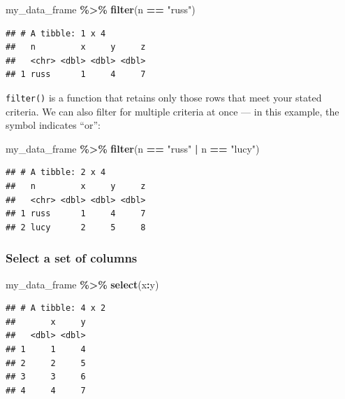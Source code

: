 \documentclass[
  12pt,
]{book}
\newenvironment{Shaded}{\begin{snugshade}}{\end{snugshade}}
\newcommand{\FunctionTok}[1]{\textcolor[rgb]{0.13,0.29,0.53}{\textbf{#1}}}
\newcommand{\NormalTok}[1]{#1}
\newcommand{\SpecialCharTok}[1]{\textcolor[rgb]{0.81,0.36,0.00}{\textbf{#1}}}
\newcommand{\StringTok}[1]{\textcolor[rgb]{0.31,0.60,0.02}{#1}}
\begin{document}
\begin{Shaded}
\begin{Highlighting}[]
\NormalTok{my\_data\_frame }\SpecialCharTok{\%\textgreater{}\%} 
  \FunctionTok{filter}\NormalTok{(n }\SpecialCharTok{==} \StringTok{"russ"}\NormalTok{)}
\end{Highlighting}
\end{Shaded}

\begin{verbatim}
## # A tibble: 1 x 4
##   n         x     y     z
##   <chr> <dbl> <dbl> <dbl>
## 1 russ      1     4     7
\end{verbatim}

\texttt{filter()} is a function that retains only those rows that meet your stated criteria. We can also filter for multiple criteria at once --- in this example, the \texttt{\textbar{}} symbol indicates ``or'':

\begin{Shaded}
\begin{Highlighting}[]
\NormalTok{my\_data\_frame }\SpecialCharTok{\%\textgreater{}\%} 
  \FunctionTok{filter}\NormalTok{(n }\SpecialCharTok{==} \StringTok{"russ"} \SpecialCharTok{|}\NormalTok{ n }\SpecialCharTok{==} \StringTok{"lucy"}\NormalTok{)}
\end{Highlighting}
\end{Shaded}

\begin{verbatim}
## # A tibble: 2 x 4
##   n         x     y     z
##   <chr> <dbl> <dbl> <dbl>
## 1 russ      1     4     7
## 2 lucy      2     5     8
\end{verbatim}

\hypertarget{select-a-set-of-columns}{%
\subsubsection{Select a set of columns}\label{select-a-set-of-columns}}

\begin{Shaded}
\begin{Highlighting}[]
\NormalTok{my\_data\_frame }\SpecialCharTok{\%\textgreater{}\%} 
  \FunctionTok{select}\NormalTok{(x}\SpecialCharTok{:}\NormalTok{y)}
\end{Highlighting}
\end{Shaded}

\begin{verbatim}
## # A tibble: 4 x 2
##       x     y
##   <dbl> <dbl>
## 1     1     4
## 2     2     5
## 3     3     6
## 4     4     7
\end{verbatim}
\end{document}
